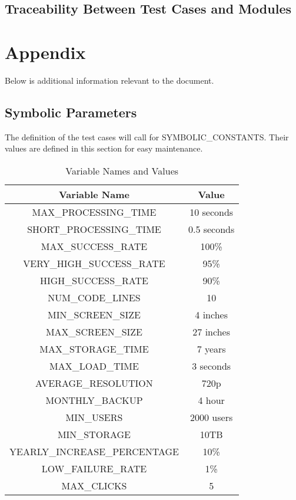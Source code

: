 \documentclass[12pt, titlepage]{article}
\begin{document}
\subsection{Traceability Between Test Cases and Modules}

				


\newpage


\newpage

\section{Appendix}

Below is additional information relevant to the document.

\subsection{Symbolic Parameters}

The definition of the test cases will call for SYMBOLIC\_CONSTANTS.
Their values are defined in this section for easy maintenance.

\begin{table}[h!]
  \centering
  \begin{tabular}{|c|c|}
      \hline
      \textbf{Variable Name} & \textbf{Value} \\
      \hline
      MAX\_PROCESSING\_TIME & 10 seconds \\
      \hline
      SHORT\_PROCESSING\_TIME & 0.5 seconds \\
      \hline
      MAX\_SUCCESS\_RATE & 100\% \\
      \hline
      VERY\_HIGH\_SUCCESS\_RATE & 95\% \\
      \hline
      HIGH\_SUCCESS\_RATE & 90\% \\
      \hline
      NUM\_CODE\_LINES & 10 \\
      \hline
      MIN\_SCREEN\_SIZE & 4 inches \\
      \hline
      MAX\_SCREEN\_SIZE & 27 inches \\
      \hline
      MAX\_STORAGE\_TIME & 7 years \\
      \hline
      MAX\_LOAD\_TIME & 3 seconds \\
      \hline
      AVERAGE\_RESOLUTION & 720p \\
      \hline
      MONTHLY\_BACKUP & 4 hour \\
      \hline
      MIN\_USERS & 2000 users \\
      \hline
      MIN\_STORAGE & 10TB \\
      \hline
      YEARLY\_INCREASE\_PERCENTAGE & 10\% \\
      \hline
      LOW\_FAILURE\_RATE & 1\% \\
      \hline
      MAX\_CLICKS & 5 \\
      \hline
  \end{tabular}
  \caption{Variable Names and Values}
  \label{tab:variables}
\end{table}
\end{document}
